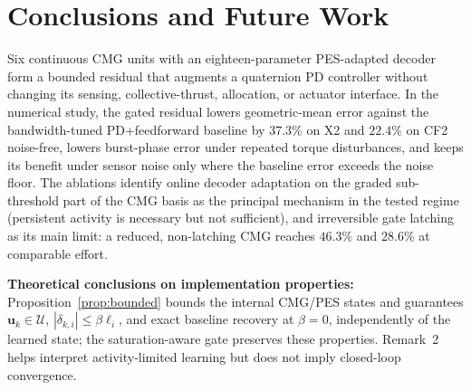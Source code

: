 \documentclass[letterpaper, 10 pt, conference]{ieeeconf}
\begin{document}


\section{Conclusions and Future Work}
\label{sec:conclusion}

Six continuous CMG units with an eighteen-parameter PES-adapted decoder form a bounded residual that augments a quaternion PD controller without changing its sensing, collective-thrust, allocation, or actuator interface. In the numerical study, the gated residual lowers geometric-mean error against the bandwidth-tuned PD+feedforward baseline by $37.3\%$ on X2 and $22.4\%$ on CF2 noise-free, lowers burst-phase error under repeated torque disturbances, and keeps its benefit under sensor noise only where the baseline error exceeds the noise floor. The ablations identify online decoder adaptation on the graded sub-threshold part of the CMG basis as the principal mechanism in the tested regime (persistent activity is necessary but not sufficient), and irreversible gate latching as its main limit: a reduced, non-latching CMG reaches $46.3\%$ and $28.6\%$ at comparable effort.

\noindent\textbf{Theoretical conclusions on implementation properties:} Proposition~\ref{prop:bounded} bounds the internal CMG/PES states and guarantees $\bm u_k\in\mathcal U$, $|\delta_{k,i}|\le\beta\ell_i$, and exact baseline recovery at $\beta=0$, independently of the learned state; the saturation-aware gate preserves these properties. Remark~2 helps interpret activity-limited learning but does not imply closed-loop convergence.
\end{document}
